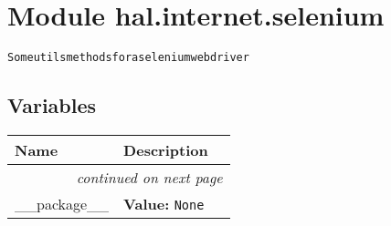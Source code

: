 %
%
%


\section{Module hal.internet.selenium}

    \label{hal:internet:selenium}
\begin{alltt}
Some utils methods for a selenium webdriver 
\end{alltt}



  \subsection{Variables}

    \vspace{-1cm}
\hspace{\varindent}\begin{longtable}{|p{\varnamewidth}|p{\vardescrwidth}|l}
\cline{1-2}
\cline{1-2} \centering \textbf{Name} & \centering \textbf{Description}& \\
\cline{1-2}
\endhead\cline{1-2}\multicolumn{3}{r}{\small\textit{continued on next page}}\\\endfoot\cline{1-2}
\endlastfoot\raggedright \_\-\_\-p\-a\-c\-k\-a\-g\-e\-\_\-\_\- & \raggedright \textbf{Value:} 
{\tt None}&\\
\cline{1-2}
\end{longtable}



